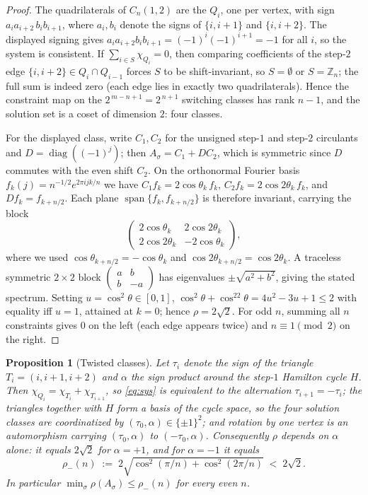 \documentclass[11pt]{article}
\newtheorem{proposition}[lemma]{Proposition}
\theoremstyle{remark}
\newcommand{\rhomax}{\rho}
\begin{document}
\begin{proof}
The quadrilaterals of $C_n(1,2)$ are the $Q_i$, one per
vertex, with sign $a_ia_{i+2}\,b_ib_{i+1}$, where $a_i,b_i$ denote the
signs of $\{i,i{+}1\}$ and $\{i,i{+}2\}$. The displayed signing gives
$a_ia_{i+2}b_ib_{i+1}=(-1)^i(-1)^{i+1}=-1$ for all $i$, so the system is
consistent. If $\sum_{i\in S}\chi_{Q_i}=0$, then comparing coefficients
of the step-$2$ edge $\{i,i{+}2\}\in Q_i\cap Q_{i-1}$ forces $S$ to be
shift-invariant, so $S=\emptyset$ or $S=\mathbb{Z}_n$; the full sum is
indeed zero (each edge lies in exactly two quadrilaterals). Hence the
constraint map on the $2^{\,m-n+1}=2^{\,n+1}$ switching classes has rank
$n-1$, and the solution set is a coset of dimension $2$: four classes.

For the displayed class, write $C_1,C_2$ for the unsigned step-$1$ and
step-$2$ circulants and $D=\operatorname{diag}((-1)^j)$; then
$A_\sigma=C_1+DC_2$, which is symmetric since $D$ commutes with the even
shift $C_2$. On the orthonormal Fourier basis
$f_k(j)=n^{-1/2}e^{2\pi ijk/n}$ we have $C_1f_k=2\cos\theta_k\,f_k$,
$C_2f_k=2\cos2\theta_k\,f_k$, and $Df_k=f_{k+n/2}$. Each plane
$\operatorname{span}\{f_k,f_{k+n/2}\}$ is therefore invariant, carrying
the block
\[
\begin{pmatrix} 2\cos\theta_k & 2\cos2\theta_k\\
2\cos2\theta_k & -2\cos\theta_k\end{pmatrix},
\]
where we used $\cos\theta_{k+n/2}=-\cos\theta_k$ and
$\cos2\theta_{k+n/2}=\cos2\theta_k$. A traceless symmetric $2\times2$
block $\left(\begin{smallmatrix}a&b\\ b&-a\end{smallmatrix}\right)$ has
eigenvalues $\pm\sqrt{a^2+b^2}$, giving the stated spectrum. Setting
$u=\cos^2\theta\in[0,1]$,
$\cos^2\theta+\cos^22\theta=4u^2-3u+1\le2$ with equality iff $u=1$,
attained at $k=0$; hence $\rhomax=2\sqrt2$. For odd $n$, summing all $n$
constraints gives $0$ on the left (each edge appears twice) and
$n\equiv1\pmod2$ on the right.
\end{proof}

\begin{proposition}[Twisted classes]\label{prop:twist}
Let $\tau_i$ denote the
sign of the triangle $T_i=(i,i{+}1,i{+}2)$ and $\alpha$ the sign product
around the step-$1$ Hamilton cycle $H$. Then
$\chi_{Q_i}=\chi_{T_i}+\chi_{T_{i+1}}$, so \eqref{eq:sys} is equivalent
to the alternation $\tau_{i+1}=-\tau_i$; the triangles together with $H$
form a basis of the cycle space, so the four solution classes are
coordinatized by $(\tau_0,\alpha)\in\{\pm1\}^2$; and rotation by one
vertex is an automorphism carrying $(\tau_0,\alpha)$ to
$(-\tau_0,\alpha)$. Consequently $\rhomax$ depends on $\alpha$ alone: it
equals $2\sqrt2$ for $\alpha=+1$, and for $\alpha=-1$ it equals
\[
\rho_-(n)\;:=\;2\sqrt{\cos^2(\pi/n)+\cos^2(2\pi/n)}\;<\;2\sqrt2 .
\]
In particular $\min_\sigma\rhomax(A_\sigma)\le\rho_-(n)$ for every even
$n$.
\end{proposition}
\end{document}
